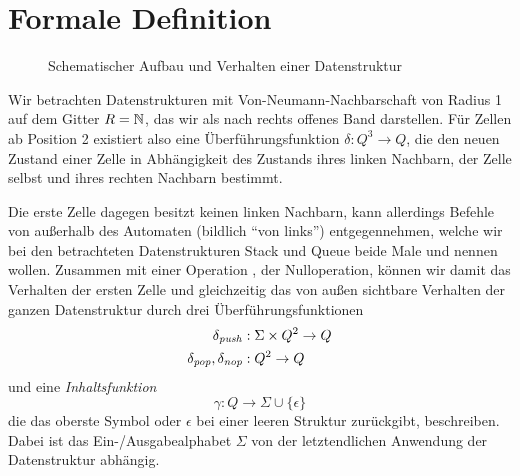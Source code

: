 \documentclass{article}
\begin{document}
\section{Formale Definition}

\begin{figure}[h]
    \centering
    \caption{Schematischer Aufbau und Verhalten einer Datenstruktur}
\end{figure}
Wir betrachten Datenstrukturen mit Von-Neumann-Nachbarschaft von Radius 1 auf dem Gitter $R = \mathbb{N}$, das wir als nach rechts offenes Band darstellen. Für Zellen ab Position 2 existiert also eine Überführungsfunktion $\delta : Q^3 \rightarrow Q$, die den neuen Zustand einer Zelle in Abhängigkeit des Zustands ihres linken Nachbarn, der Zelle selbst und ihres rechten Nachbarn bestimmt.

Die erste Zelle dagegen besitzt keinen linken Nachbarn, kann allerdings Befehle von außerhalb des Automaten (bildlich "`von links"') entgegennehmen, welche wir bei den betrachteten Datenstrukturen Stack und Queue beide Male \push und \pop nennen wollen. Zusammen mit einer Operation \nop, der Nulloperation, können wir damit das Verhalten der ersten Zelle und gleichzeitig das von außen sichtbare Verhalten der ganzen Datenstruktur durch drei Überführungsfunktionen
\begin{align*}
    \delta_{\mathit{push}} &: \Sigma \times Q^2 \rightarrow Q \\
    \delta_{\mathit{pop}}, \delta_{\mathit{nop}} &: Q^2 \rightarrow Q
\end{align*}
und eine \emph{Inhaltsfunktion}
\[ \gamma : Q \rightarrow \Sigma \cup \{\epsilon\} \]
die das oberste Symbol oder $\epsilon$ bei einer leeren Struktur zurückgibt, beschreiben. Dabei ist das Ein-/Ausgabealphabet $\Sigma$ von der letztendlichen Anwendung der Datenstruktur abhängig.
\end{document}
